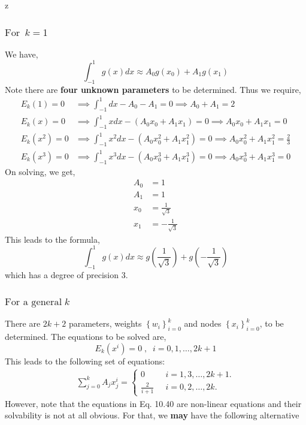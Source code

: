 z\documentclass[a4paper,12pt,twoside]{book}
\newcommand{\nll}[0]{\newline\newline}
\begin{document}
\subsubsection{$\boxed{\text{For} \;\ k=1}$}
We have,
\[ \int_{-1}^1 g(x) dx \approx A_0g(x_0) + A_1g(x_1) \]
Note there are \textbf{four unknown parameters} to be determined.
\nll
Thus we require,
\begin{equation}
\begin{split}
    E_k(1) = 0 &\implies \int_{-1}^1dx - A_0-A_1 = 0 \implies A_0 + A_1 = 2\\
    E_k(x) = 0 &\implies \int_{-1}^1xdx - (A_0x_0 + A_1x_1) = 0 \implies A_0x_0 + A_1x_1 = 0\\
    E_k(x^2) = 0 &\implies \int_{-1}^1 x^2 dx - (A_0x_0^2 + A_1x_1^2) = 0 \implies A_0x_0^2 + A_1x_1^2 = \frac{2}{3}\\
    E_k(x^3) = 0 &\implies \int_{-1}^1 x^3dx - (A_0x_0^3 + A_1x_1^3) = 0 \implies A_0x_0^3 + A_1x_1^3 = 0
\end{split}
\end{equation}
On solving, we get,
\begin{equation*}
\begin{split}
    A_0 &= 1\\
    A_1 &= 1\\
    x_0 &= \frac{1}{\sqrt{3}}\\
    x_1 &= -\frac{1}{\sqrt{3}}
\end{split}
\end{equation*}
This leads to the formula,
\begin{equation*}
    \boxed{\int_{-1}^1 g(x)dx \approx g\left( \frac{1}{\sqrt{3}}\right) + g\left(-\frac{1}{\sqrt{3}}\right)}
\end{equation*}
which has a degree of precision 3.
\subsubsection{$\boxed{\text{For a general} \;k}$}
There are $2k+2$ parameters, weights $\left\{ w_i \right\}_{i=0}^k$ and nodes $\left\{ x_i \right\}_{i=0}^k$, to be determined.
\nll
The equations to be solved are,
\begin{equation}
    E_k(x^i) = 0\;,\;\;i=0,1,\dots,2k+1
\end{equation}
This leads to the following set of equations:
\begin{equation}
\begin{split}
   \boxed{\boxed{ \sum_{j=0}^k A_jx_j^i = \begin{cases} 0 \;\;& i=1,3,\dots,2k+1.\\
    \frac{2}{i+1} \;\;& i=0,2,\dots,2k.
    \end{cases}}}
\end{split}
\end{equation}
However, note that the equations in Eq. 10.40 are non-linear equations and their solvability is not at all obvious. For that, we \textbf{may} have the following alternative
\end{document}
